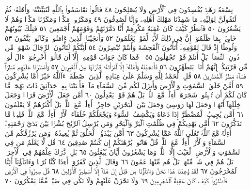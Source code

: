 تِسْعَةُ رَهْطࣲ يُفْسِدُونَ فِي ٱلْأَرْضِ وَلَا يُصْلِحُونَ ٤٨
قَالُوا۟ تَقَاسَمُوا۟ بِٱللَّهِ لَنُبَيِّتَنَّهُۥ وَأَهْلَهُۥ ثُمَّ لَنَقُولَنَّ لِوَلِيِّهِۦ
مَا شَهِدْنَا مَهْلِكَ أَهْلِهِۦ وَإِنَّا لَصَٰدِقُونَ ٤٩ وَمَكَرُوا۟
مَكْرࣰا وَمَكَرْنَا مَكْرࣰا وَهُمْ لَا يَشْعُرُونَ ٥٠ فَٱنظُرْ
كَيْفَ كَانَ عَٰقِبَةُ مَكْرِهِمْ أَنَّا دَمَّرْنَٰهُمْ وَقَوْمَهُمْ
أَجْمَعِينَ ٥١ فَتِلْكَ بُيُوتُهُمْ خَاوِيَةَۢ بِمَا ظَلَمُوٓا۟ۚ إِنَّ
فِي ذَٰلِكَ لَأٓيَةࣰ لِّقَوْمࣲ يَعْلَمُونَ ٥٢ وَأَنجَيْنَا ٱلَّذِينَ ءَامَنُوا۟
وَكَانُوا۟ يَتَّقُونَ ٥٣ وَلُوطًا إِذْ قَالَ لِقَوْمِهِۦٓ أَتَأْتُونَ
ٱلْفَٰحِشَةَ وَأَنتُمْ تُبْصِرُونَ ٥٤ أَئِنَّكُمْ لَتَأْتُونَ ٱلرِّجَالَ
شَهْوَةࣰ مِّن دُونِ ٱلنِّسَآءِۚ بَلْ أَنتُمْ قَوْمࣱ تَجْهَلُونَ ٥٥
۞ فَمَا كَانَ جَوَابَ قَوْمِهِۦٓ إِلَّآ أَن قَالُوٓا۟ أَخْرِجُوٓا۟ ءَالَ
لُوطࣲ مِّن قَرْيَتِكُمْۖ إِنَّهُمْ أُنَاسࣱ يَتَطَهَّرُونَ ٥٦ فَأَنجَيْنَٰهُ
وَأَهْلَهُۥٓ إِلَّا ٱمْرَأَتَهُۥ قَدَّرْنَٰهَا مِنَ ٱلْغَٰبِرِينَ ٥٧ وَأَمْطَرْنَا
عَلَيْهِم مَّطَرࣰاۖ فَسَآءَ مَطَرُ ٱلْمُنذَرِينَ ٥٨ قُلِ ٱلْحَمْدُ لِلَّهِ
وَسَلَٰمٌ عَلَىٰ عِبَادِهِ ٱلَّذِينَ ٱصْطَفَىٰٓۗ ءَآللَّهُ خَيْرٌ أَمَّا يُشْرِكُونَ ٥٩
أَمَّنْ خَلَقَ ٱلسَّمَٰوَٰتِ وَٱلْأَرْضَ وَأَنزَلَ لَكُم مِّنَ ٱلسَّمَآءِ
مَآءࣰ فَأَنۢبَتْنَا بِهِۦ حَدَآئِقَ ذَاتَ بَهْجَةࣲ مَّا كَانَ لَكُمْ أَن
تُنۢبِتُوا۟ شَجَرَهَآۗ أَءِلَٰهࣱ مَّعَ ٱللَّهِۚ بَلْ هُمْ قَوْمࣱ يَعْدِلُونَ ٦٠
أَمَّن جَعَلَ ٱلْأَرْضَ قَرَارࣰا وَجَعَلَ خِلَٰلَهَآ أَنْهَٰرࣰا وَجَعَلَ
لَهَا رَوَٰسِيَ وَجَعَلَ بَيْنَ ٱلْبَحْرَيْنِ حَاجِزًاۗ أَءِلَٰهࣱ مَّعَ ٱللَّهِۚ
بَلْ أَكْثَرُهُمْ لَا يَعْلَمُونَ ٦١ أَمَّن يُجِيبُ ٱلْمُضْطَرَّ إِذَا
دَعَاهُ وَيَكْشِفُ ٱلسُّوٓءَ وَيَجْعَلُكُمْ خُلَفَآءَ ٱلْأَرْضِۗ
أَءِلَٰهࣱ مَّعَ ٱللَّهِۚ قَلِيلࣰا مَّا تَذَكَّرُونَ ٦٢ أَمَّن يَهْدِيكُمْ فِي
ظُلُمَٰتِ ٱلْبَرِّ وَٱلْبَحْرِ وَمَن يُرْسِلُ ٱلرِّيَٰحَ بُشْرَۢا بَيْنَ يَدَيْ
رَحْمَتِهِۦٓۗ أَءِلَٰهࣱ مَّعَ ٱللَّهِۚ تَعَٰلَى ٱللَّهُ عَمَّا يُشْرِكُونَ ٦٣
أَمَّن يَبْدَؤُا۟ ٱلْخَلْقَ ثُمَّ يُعِيدُهُۥ وَمَن يَرْزُقُكُم مِّنَ ٱلسَّمَآءِ وَٱلْأَرْضِۗ
أَءِلَٰهࣱ مَّعَ ٱللَّهِۚ قُلْ هَاتُوا۟ بُرْهَٰنَكُمْ إِن كُنتُمْ صَٰدِقِينَ ٦٤ قُل
لَّا يَعْلَمُ مَن فِي ٱلسَّمَٰوَٰتِ وَٱلْأَرْضِ ٱلْغَيْبَ إِلَّا ٱللَّهُۚ وَمَا يَشْعُرُونَ
أَيَّانَ يُبْعَثُونَ ٦٥ بَلِ ٱدَّٰرَكَ عِلْمُهُمْ فِي ٱلْأٓخِرَةِۚ بَلْ هُمْ فِي
شَكࣲّ مِّنْهَاۖ بَلْ هُم مِّنْهَا عَمُونَ ٦٦ وَقَالَ ٱلَّذِينَ كَفَرُوٓا۟ أَءِذَا
كُنَّا تُرَٰبࣰا وَءَابَآؤُنَآ أَئِنَّا لَمُخْرَجُونَ ٦٧ لَقَدْ وُعِدْنَا هَٰذَا
نَحْنُ وَءَابَآؤُنَا مِن قَبْلُ إِنْ هَٰذَآ إِلَّآ أَسَٰطِيرُ ٱلْأَوَّلِينَ ٦٨
قُلْ سِيرُوا۟ فِي ٱلْأَرْضِ فَٱنظُرُوا۟ كَيْفَ كَانَ عَٰقِبَةُ ٱلْمُجْرِمِينَ ٦٩
وَلَا تَحْزَنْ عَلَيْهِمْ وَلَا تَكُن فِي ضَيْقࣲ مِّمَّا يَمْكُرُونَ ٧٠
